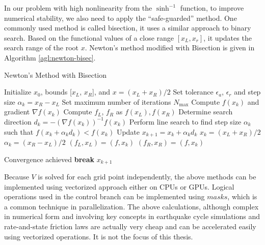 In our problem with high nonlinearity from the $\sinh^{-1}$ function, to improve numerical stability, we also need to apply the ``safe-guarded'' method.
One commonly used method is called bisection, it uses a similar approach to binary search. 
Based on the functional values of a close range $[x_L, x_r]$, it updates the search range of the root $x$.
Newton's method modified with Bisection is given in Algorithm \ref{agl:newton-bisec}.

\begin{algorithm}
\caption{Newton's Method with Bisection}
\begin{algorithmic}[1]
\State Initialize $x_0$, bounds [$x_L$, $x_R$], and $x = (x_L + x_R) / 2$
\State Set tolerance $\epsilon_a$, $\epsilon_r$ and step size $\alpha_k = x_R - x_L$
\State Set maximum number of iterations $N_{\max}$
    \State Compute $f(x_k)$ and gradient $\nabla f(x_k)$
    \State Compute $f_L$, $f_R$ as $f(x_L), f(x_R)$  
    \State Determine search direction $d_k = -(\nabla f(x_k))^{-1} f(x_k)$
    \State Perform line search to find step size $\alpha_k$ such that $f(x_k + \alpha_k d_k) < f(x_k)$
    \State Update $x_{k+1} = x_k + \alpha_k d_k$
        \State $x_k = (x_L + x_R) / 2$
        \State $\alpha_k = (x_R - x_L) / 2$
    \EndIf
        \State $(f_L, x_L) = (f, x_k)$
    \Else
        \State $(f_R, x_R) = (f, x_k)$
    \EndIf
    
    
        \State Convergence achieved
        \State \textbf{break}
    \EndIf
\EndFor
\Return $x_{k+1}$
\end{algorithmic}
\label{agl:newton-bisec}
\end{algorithm}

Because $V$ is solved for each grid point independently, the above methods can be implemented using vectorized approach either on CPUs or GPUs.
Logical operations used in the control branch can be implemented using $masks$, which is a common technique in parallelization. 
The above calculations, although complex in numerical form and involving key concepts in earthquake cycle simulations and rate-and-state friction laws are actually very cheap and can be accelerated easily using vectorized operations. It is not the focus of this thesis.


